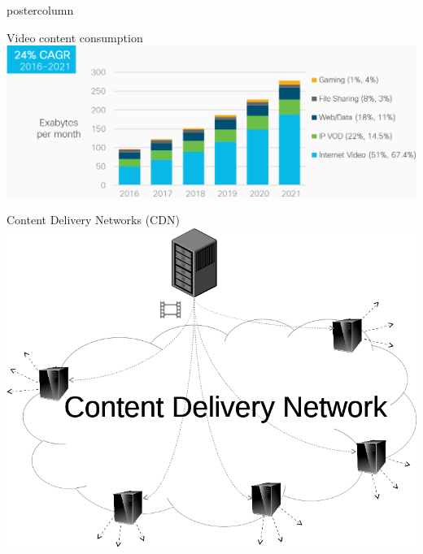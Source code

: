 \def\ptitle{\pname: Private Collaborative Streaming} %
\def\pauthor{Simon Da Silva} %
\def\pcollaborators{Daniel Negru, Laurent Reveillere} %
\def\pteam{PROGRESS} %
\def\pinstitute{Univ. Bordeaux, LaBRI, France} %
\def\pdate{Jeudi 26 Juin, 2025} %
\def\plogo{logo/logo_UB.jpg}



\graphicspath{{./fig/}} %
\setlength{\columnheight}{588ex} %
\newcommand{\pname}{\textsc{Priva-Stream}\xspace} %


\begin{frame}
  \begin{columns}
    \begin{column}{.49\textwidth}
      \begin{beamercolorbox}[center,wd=\textwidth]{postercolumn}
        \begin{minipage}[T]{.95\textwidth}
          \parbox[t][\columnheight]{\textwidth}{
            
            \begin{block}{Video content consumption}
            \centering
            \includegraphics[width=.925\textwidth]{sample/cisco-vni-2021.png}            
            \end{block}
            
            \begin{block}{Content Delivery Networks (CDN)}
            \centering
            \includegraphics[width=.33\textwidth]{sample/CDN.png}
            \end{block}
            
}
\end{minipage}
\end{beamercolorbox}
\end{column}
\end{columns}
\end{frame}
